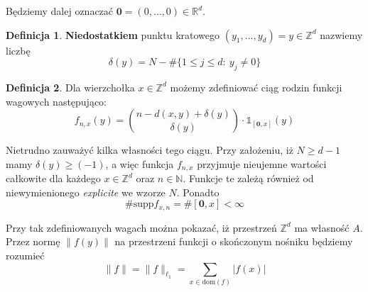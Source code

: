 \documentclass[licencjacka]{pracamgr}
\theoremstyle{definition}
\newtheorem{definition}{Definicja}[section]
\theoremstyle{definition}
\theoremstyle{definition}
\theoremstyle{definition}
\theoremstyle{definition}
\theoremstyle{plain}
\theoremstyle{plain}
\begin{document}
Będziemy dalej oznaczać $ \textbf{0} = (0, \dots, 0) \in \mathbb{R}^d $.

\begin{definition}
	\textbf{Niedostatkiem} punktu kratowego $ (y_1, \dots, y_d) = y \in \mathbb{Z}^d $ 
	nazwiemy liczbę 
	$$ \delta(y) = N - \# \{1 \leq j \leq d: ~ y_j \neq 0 \} $$
\end{definition}

\begin{definition}
	Dla wierzchołka $ x \in \mathbb{Z}^d $ możemy zdefiniować ciąg rodzin funkcji wagowych 
	następująco:
	$$ f_{n,x}(y) = {n - d(x,y) + \delta(y) \choose \delta(y)} \cdot 
	\mathbb{1}_{[\textbf{0},x]} (y)$$
\end{definition}

Nietrudno zauważyć kilka własności tego ciągu. Przy założeniu, iż $ N \geq d - 1 $ mamy 
$ \delta(y) \geq (-1) $, a więc funkcja $ f_{n,x} $ przyjmuje nieujemne wartości 
całkowite dla każdego $ x \in \mathbb{Z}^d $ oraz $ n \in \mathbb{N} $. Funkcje te 
zależą również od niewymienionego \textit{explicite} we wzorze $ N $. Ponadto 
$$ \# \text{supp}f_{x,n} = \# [\textbf{0}, x] < \infty $$

Przy tak zdefiniowanych wagach można pokazać, iż przestrzeń $ \mathbb{Z}^d $ ma własność 
$ A $. Przez normę $ \| f(y)\| $ na przestrzeni funkcji o skończonym 
nośniku będziemy rozumieć 
$$ \| f \| = \| f \|_{\ell_1} = \sum\limits_{x \in \text{dom}(f)} |f(x)| $$
\end{document}
